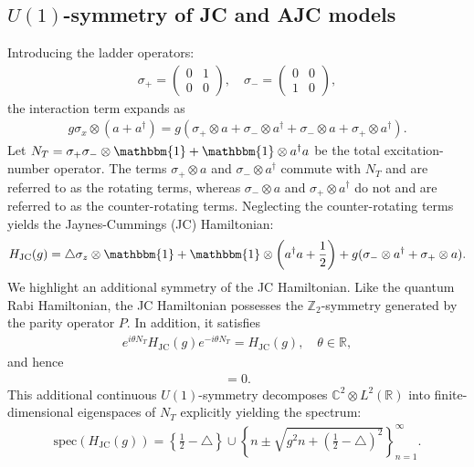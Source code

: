 \documentclass[12pt,dvipdfmx]{article}
\newcommand{\RR}{\mathbb{R}}
\newcommand{\ZZ}{\mathbb{Z}}
\newcommand{\CC}{\mathbb{C}}
\newcommand{\one}{\mathbbm{1}}
\begin{document}
\subsection{$U(1)$-symmetry of JC and AJC models}
%
%
Introducing the ladder operators:  
\begin{align*}
    \sigma_+ = \begin{pmatrix} 0 & 1\\ 0 & 0 \end{pmatrix}, 
    \quad
    \sigma_- = \begin{pmatrix} 0 & 0\\ 1 & 0 \end{pmatrix},
\end{align*}
the interaction term expands as
\begin{align*}
    g\sigma_x \otimes (a+a^\dagger)
    = 
    g\left(
        \sigma_+ \otimes a + \sigma_- \otimes a^\dagger 
        + \sigma_- \otimes a + \sigma_+ \otimes a^\dagger
    \right).
\end{align*}
Let 
$
    N_T = \sigma_+\sigma_- \otimes \one + \one \otimes a^\dagger a
$
be the total excitation-number operator. The terms $\sigma_+ \otimes a$ and $\sigma_- \otimes a^\dagger$ commute with $N_T$ and are referred to as the rotating terms, whereas $\sigma_- \otimes a$ and $\sigma_+ \otimes a^\dagger$ do not and are referred to as the counter-rotating terms. Neglecting the counter-rotating terms yields the Jaynes-Cummings (JC) Hamiltonian:
\begin{align*}
    H_\mathrm{JC} (g) 
    = 
    \triangle\sigma_z \otimes \one 
    + 
    \one \otimes \left( a^\dagger a + \frac12 \right) 
    + 
    g(\sigma_- \otimes a^\dagger + \sigma_+ \otimes a). 
\end{align*}
We highlight an additional symmetry of the JC Hamiltonian. Like the quantum Rabi Hamiltonian, the JC Hamiltonian possesses the $\ZZ_2$-symmetry generated by the parity operator $P$. In addition, it satisfies
\begin{align}\label{eq:JC_U1_symm}
    e^{i\theta N_T} H_{\mathrm{JC} }(g) e^{-i\theta N_T}
    = 
    H_{\mathrm{JC} }(g),
    \quad
    \theta \in \RR,
\end{align}
and hence
\begin{align*}
    [H_{\mathrm{JC} }(g), N_T] = 0.
\end{align*}
This additional continuous $U(1)$-symmetry decomposes $\CC^2 \otimes L^2(\RR)$ into finite-dimensional eigenspaces of $N_T$ explicitly yielding the spectrum:
\begin{align*}
    \mathrm{spec}(H_{\mathrm{JC} }(g)) 
    = 
    \left\{ \frac12 - \triangle \right\} 
    \cup 
    \left\{ 
        n \pm \sqrt{ g^2 n + \left( \frac12 - \triangle \right)^2 }
    \right\}_{n=1}^{\infty}.
\end{align*}
\end{document}
